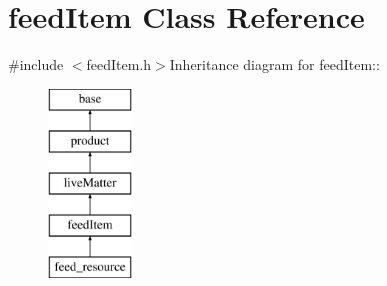 \hypertarget{classfeed_item}{
\section{feedItem Class Reference}
\label{classfeed_item}
}


{\ttfamily \#include $<$feedItem.h$>$}Inheritance diagram for feedItem::\begin{figure}[H]
\begin{center}
\leavevmode
\includegraphics[height=5cm]{classfeed_item}
\end{center}
\end{figure}
